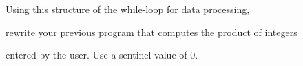 Using this structure of the while-loop for data processing,

rewrite your previous program that computes the product of integers

entered by the user. Use a sentinel value of 0.

